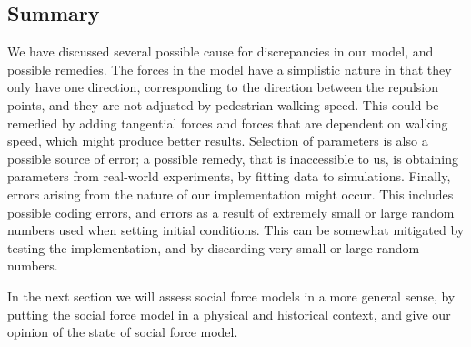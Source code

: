 \subsection{Summary}
We have discussed several possible cause for discrepancies in our model, and possible 
remedies. The forces in the model have a simplistic nature in that they only 
have one direction, corresponding to the direction between the repulsion 
points, and they are not adjusted by pedestrian walking speed. This could be 
remedied by adding tangential forces and forces that are dependent on walking 
speed, which might produce better results. Selection of parameters is also a 
possible source of error; a possible remedy, that is inaccessible to us, is 
obtaining parameters from real-world experiments, by fitting data to 
simulations. Finally, errors arising from the nature of our implementation 
might occur. This includes possible coding errors, and errors as a result of 
extremely small or large random numbers used when setting initial conditions. 
This can be somewhat mitigated by testing the implementation, and by 
discarding very small or large random numbers.

In the next section we will assess social force models in a more general sense, 
by putting the social force model in a physical and historical context, and give 
our opinion of the state of social force model.
